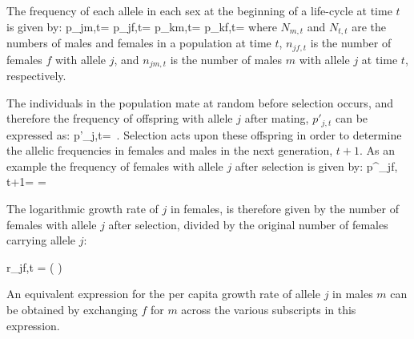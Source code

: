 \documentclass[12pt]{article}
\let\oldequation\equation
\let\oldendequation\endequation
\renewenvironment{equation}
  {\linenomathNonumbers\oldequation}
  {\oldendequation\endlinenomath}
\begin{document}
 The frequency of each allele in each sex at the beginning of a life-cycle at time $t$ is given by:
 \begin{equation}
     p_{jm,t}= 
     \label{first_pop}
 \end{equation}
 \begin{equation}
     p_{jf,t}= 
 \end{equation}
 \begin{equation}
     p_{km,t}= 
 \end{equation}
 \begin{equation}
     p_{kf,t}= 
 \end{equation}
 where $N_{m,t}$ and $N_{t,t}$ are the numbers of males and females in a population at time $t$, $n_{jf,t}$ is the number of females $f$ with allele $j$, and $n_{jm,t}$ is the number of males $m$ with allele $j$ at time $t$, respectively.

 The individuals in the population mate at random before selection occurs, and therefore the frequency of offspring with allele $j$ after mating, $p'_{j,t}$ can be expressed as:
 \begin{equation}
    p'_{j,t}=  \,.
    \label{pprime}
 \end{equation}
 Selection acts upon these offspring in order to determine the allelic frequencies in females and males in the next generation, $t+1$. As an example the frequency  of females with allele $j$ after selection is given by:
 \begin{equation}
    p^{\prime}_{jf, t+1}=  = 
    \label{next_gen}
 \end{equation}

 The logarithmic growth rate of $j$ in females, is therefore given by the number of females with allele $j$ after selection, divided by the original number of females carrying allele $j$:



 \begin{equation}
     r_{jf,t} = \ln \left(  \right)
     \label{canonical}
 \end{equation}

 An equivalent expression for the per capita growth rate of allele $j$ in males $m$ can be obtained by exchanging $f$ for $m$ across the various subscripts in this expression.
\end{document}
